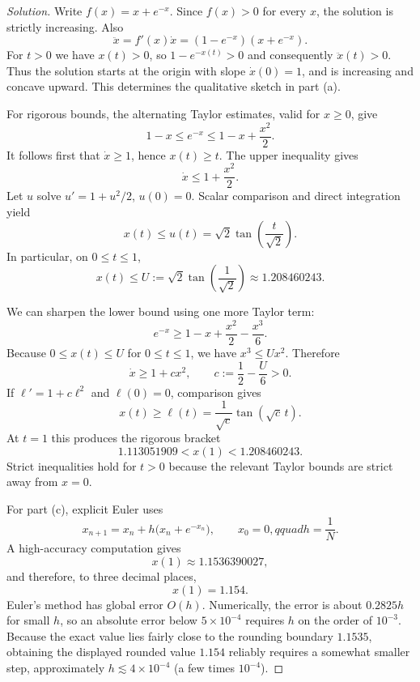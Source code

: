 \documentclass[10pt]{amsart}
\newenvironment{solution}
{\begin{proof}[Solution]}
{\end{proof}}
\begin{document}
\begin{onehalfspace}
        \begin{solution}
            Write $f(x)=x+e^{-x}$. Since $f(x)>0$ for every $x$, the solution is
            strictly increasing. Also
            \[
                \ddot{x}=f'(x)\dot{x}=(1-e^{-x})(x+e^{-x}).
            \]
            For $t>0$ we have $x(t)>0$, so $1-e^{-x(t)}>0$ and consequently
            $\ddot{x}(t)>0$. Thus the solution starts at the origin with slope
            $\dot{x}(0)=1$, and is increasing and concave upward. This determines the
            qualitative sketch in part (a).

            For rigorous bounds, the alternating Taylor estimates, valid for $x\geq0$,
            give
            \[
                1-x\leq e^{-x}\leq 1-x+\frac{x^2}{2}.
            \]
            It follows first that $\dot{x}\geq1$, hence $x(t)\geq t$. The upper
            inequality gives
            \[
                \dot{x}\leq1+\frac{x^2}{2}.
            \]
            Let $u$ solve $u'=1+u^2/2$, $u(0)=0$. Scalar comparison and direct
            integration yield
            \[
                x(t)\leq u(t)=\sqrt2\tan\left(\frac{t}{\sqrt2}\right).
            \]
            In particular, on $0\leq t\leq1$,
            \[
                x(t)\leq U:=\sqrt2\tan\left(\frac1{\sqrt2}\right)
                \approx1.208460243.
            \]

            We can sharpen the lower bound using one more Taylor term:
            \[
                e^{-x}\geq1-x+\frac{x^2}{2}-\frac{x^3}{6}.
            \]
            Because $0\leq x(t)\leq U$ for $0\leq t\leq1$, we have $x^3\leq Ux^2$.
            Therefore
            \[
                \dot{x}\geq1+cx^2,
                \qquad c:=\frac12-\frac{U}{6}>0.
            \]
            If $\ell'=1+c\ell^2$ and $\ell(0)=0$, comparison gives
            \[
                x(t)\geq\ell(t)=\frac{1}{\sqrt c}\tan(\sqrt c\,t).
            \]
            At $t=1$ this produces the rigorous bracket
            \[
                \boxed{
                    1.113051909
                    <x(1)<
                    1.208460243 }.
            \]
            Strict inequalities hold for $t>0$ because the relevant Taylor bounds are
            strict away from $x=0$.

            For part (c), explicit Euler uses
            \[
                x_{n+1}=x_n+h\bigl(x_n+e^{-x_n}\bigr),
                \qquad x_0=0,qquad h=\frac1N.
            \]
            A high-accuracy computation gives
            \[
                x(1)\approx1.1536390027,
            \]
            and therefore, to three decimal places,
            \[
                \boxed{x(1)=1.154.}
            \]
            Euler's method has global error $O(h)$. Numerically, the error is about
            $0.2825h$ for small $h$, so an absolute error below $5\times10^{-4}$
            requires $h$ on the order of $10^{-3}$. Because the exact value lies fairly
            close to the rounding boundary $1.1535$, obtaining the displayed rounded
            value $1.154$ reliably requires a somewhat smaller step, approximately
            $h\lesssim4\times10^{-4}$ (a few times $10^{-4}$).


\end{solution}
\end{onehalfspace}
\end{document}
